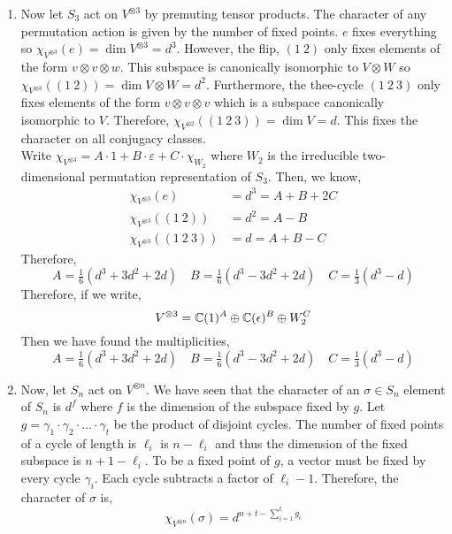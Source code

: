 \documentclass[12pt]{extarticle}
\begin{document}
\begin{enumerate}
\item
Now let $S_3$ act on $V^{\otimes 3}$ by premuting tensor products. The character of any permutation action is given by the number of fixed points. $e$ fixes everything so $\chi_{V^{\otimes 3}}(e) = \dim{V^{\otimes 3}} = d^3$. However, the flip, $(1 \: 2)$ only fixes elements of the form $v \otimes v \otimes w$. This subspace is canonically isomorphic to $V \otimes W$ so $\chi_{V^{\otimes 3}}((1 \: 2)) = \dim{V \otimes W} = d^2$. Furthermore, the thee-cycle $(1 \: 2 \: 3)$ only fixes elements of the form $v \otimes v \otimes v$ which is a subspace canonically isomorphic to $V$. Therefore, $\chi_{V^{\otimes 2}}((1 \: 2 \: 3)) = \dim{V} = d$. This fixes the character on all conjugacy classes. \bigskip \\
Write $\chi_{V^{\otimes 3}} = A \cdot 1 + B \cdot \varepsilon + C \cdot \chi_{W_2}$ where $W_2$ is the irreducible two-dimensional permutation representation of $S_3$. Then, we know,
\begin{align*}
\chi_{V^{\otimes 3}}(e) &= d^3 = A + B + 2 C \\
\chi_{V^{\otimes 3}}((1 \: 2)) &= d^2 = A - B  \\
\chi_{V^{\otimes 3}}((1 \: 2 \: 3)) &= d = A + B - C 
\end{align*} 
Therefore,
\[ A = \tfrac{1}{6}(d^3 + 3d^2 + 2d) \quad B = \tfrac{1}{6}(d^3 - 3 d^2 + 2d) \quad C = \tfrac{1}{3} (d^3 - d)\]
Therefore, if we write,
\[ V^{\otimes 3} = \mathbb{C}(1)^A \oplus \mathbb{C}(\epsilon)^B \oplus W_2^C\] 
Then we have found the multiplicities,
\[ A = \tfrac{1}{6}(d^3 + 3d^2 + 2d) \quad B = \tfrac{1}{6}(d^3 - 3 d^2 + 2d) \quad C = \tfrac{1}{3} (d^3 - d)\]
\item
Now, let $S_n$ act on $V^{\otimes n}$. We have seen that the character of an $\sigma \in S_n$ element of $S_n$ is $d^{f}$ where $f$ is the dimension of the subspace fixed by $g$. Let $g = \gamma_1 \cdot \gamma_2 \cdot \dots \cdot \gamma_t$ be the product of disjoint cycles. The number of fixed points of a cycle of length is $\ell_i$ is $n - \ell_i$ and thus the dimension of the fixed subspace is $n + 1 - \ell_i$. To be a fixed point of $g$, a vector must be fixed by every cycle $\gamma_i$. Each cycle subtracts a factor of $\ell_i - 1$. Therefore, the character of $\sigma$ is, 
\[ \chi_{V^{\otimes n}}(\sigma) = d^{n + t - \sum_{i = 1}^t g_i}\] 
\end{enumerate}
\end{document}
